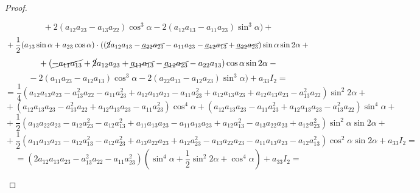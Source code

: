 \begin{proof}
\begin{itemize}
\begin{equation*}
	{} + 2(a_{12} a_{23} - a_{13} a_{22}) \cos^3 \alpha -
	2(a_{12} a_{13} - a_{11} a_{23}) \sin^3 \alpha) + {}
	\end{equation*}
	\begin{equation*}
	{} + \frac12 (a_{13} \sin \alpha + a_{23} \cos \alpha) \cdot
	((\cancel2 a_{12} a_{13} - \cancel{a_{22} a_{23}} - a_{11} a_{23} - \cancel{a_{12} a_{13}} + \cancel{a_{22} a_{23}}) \sin \alpha \sin 2\alpha + {}
	\end{equation*}
	\begin{equation*}
	{} + (\cancel{-a_{11} a_{13}} + \cancel2 a_{12} a_{23} + \cancel{a_{11} a_{13}} - \cancel{a_{12} a_{23}} - a_{22} a_{13}) \cos \alpha \sin 2\alpha - {}
	\end{equation*}
	\begin{equation*}
	{} - 2(a_{11} a_{23} - a_{12} a_{13}) \cos^3 \alpha -
	2(a_{22} a_{13} - a_{12} a_{23}) \sin^3 \alpha) + a_{33} I_2 =
	\end{equation*}
	\begin{equation*}
	= \frac14 (a_{12} a_{13} a_{23} - a_{13}^2 a_{22} - a_{11} a_{23}^2 + a_{12} a_{13} a_{23} - a_{11} a_{23}^2 + a_{12} a_{13} a_{23} + a_{12} a_{13} a_{23} - a_{13}^2 a_{22}) \sin^2 2\alpha + {}
	\end{equation*}
	\begin{equation*}
	{} + (a_{12} a_{13} a_{23} - a_{13}^2 a_{22} + a_{12} a_{13} a_{23} - a_{11} a_{23}^2) \cos^4 \alpha +
	(a_{12} a_{13} a_{23} - a_{11} a_{23}^2 + a_{12} a_{13} a_{23} - a_{13}^2 a_{22}) \sin^4 \alpha + {}
	\end{equation*}
	\begin{equation*}
	{} + \frac12 (a_{13} a_{22} a_{23} - a_{12} a_{23}^2 - a_{12} a_{13}^2 + a_{11} a_{13} a_{23} - a_{11} a_{13} a_{23} + a_{12} a_{13}^2 - a_{13} a_{22} a_{23} + a_{12} a_{23}^2) \sin^2 \alpha \sin 2\alpha + {}
	\end{equation*}
	\begin{equation*}
	{} + \frac12 (a_{11} a_{13} a_{23} - a_{12} a_{13}^2 - a_{12} a_{23}^2 + a_{13} a_{22} a_{23} + a_{12} a_{23}^2 - a_{13} a_{22} a_{23} - a_{11} a_{13} a_{23} - a_{12} a_{13}^2) \cos^2 \alpha \sin 2\alpha + a_{33} I_2 =
	\end{equation*}
	\begin{equation*}
	= (2a_{12} a_{13} a_{23} - a_{13}^2 a_{22} - a_{11} a_{23}^2) \left(\sin^4 \alpha + \frac12 \sin^2 2\alpha + \cos^4 \alpha\right) + a_{33} I_2 =
	\end{equation*}
	\begin{equation*}

\end{equation*}
\end{itemize}
\end{proof}
